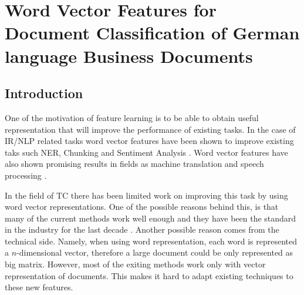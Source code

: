 \chapter{Word Vector Features  for Document Classification of German language Business Documents}
\label{chap:rel_word2vec_doc_classification}




\section{Introduction}
\label{sec:w2v4tc_intro}

One of the motivation of feature learning is to be able to
obtain useful representation that will improve the performance of  existing tasks. In the case of
\ac{IR}/\ac{NLP} related tasks  word vector features have been shown to
improve existing taks such \ac{NER}, Chunking and Sentiment Analysis
\cite{Turian:2010:WRS:1858681.1858721}
\cite{DBLP:journals/corr/abs-1103-0398}. Word vector features have also shown
promising results in fields as machine translation and speech processing \cite{collobert:2008}
\cite{DBLP:journals/corr/MikolovLS13}.  

In the field of \ac{TC}  there has been  limited work on improving  this
task by using word vector representations. One of the  possible reasons  behind this,
is that many of the current  methods work well enough and they have been the standard in
the industry for the last decade \cite{Sebastiani02} . Another possible reason comes from the
technical side. Namely, when using word representation, each word is represented a $n$-dimensional vector, therefore a large document could be only
represented as big matrix. However, most of the exiting methods work only with vector
representation of documents. This makes  it hard to adapt existing
techniques to these new features.  

